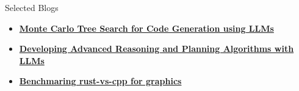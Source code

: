\documentclass{resume} %
\begin{document}
\begin{rSection}{Selected Blogs}
\begin{itemize}
\item \href{https://arunpatro.github.io/blog/mcts/}{\bf Monte Carlo Tree Search for Code Generation using LLMs} 
\item \href{https://blog.normalcomputing.ai/posts/2023-11-05-search-based-reasoning/search-based-reasoning.html}{\bf Developing Advanced Reasoning and Planning Algorithms with LLMs} 
\item \href{https://arunpatro.github.io/blog/graphics/}{\bf Benchmaring rust-vs-cpp for graphics} 
\end{itemize}

\end{rSection}

\clearpage
\end{document}
